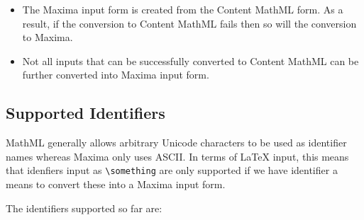 
\begin{itemize}
\item
  The Maxima input form is created from the Content MathML form. As a result,
  if the conversion to Content MathML fails then so will the conversion to
  Maxima.

\item
  Not all inputs that can be successfully converted to Content MathML can
  be further converted into Maxima input form.
\end{itemize}

\subsection*{Supported Identifiers}

MathML generally allows arbitrary Unicode characters to be used as identifier
names whereas Maxima only uses ASCII. In terms of LaTeX input, this means that
idenfiers input as \verb|\something| are only supported if we have identifier a
means to convert these into a Maxima input form.

The identifiers supported so far are:

